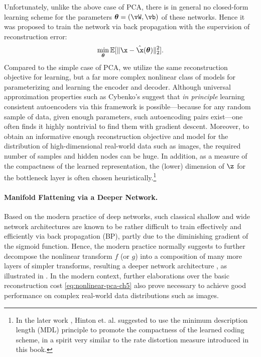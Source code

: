 \documentclass[../../book-main.tex]{subfiles}
\begin{document}
Unfortunately, unlike the above case of PCA, there is in general no
closed-form learning scheme for the parameters $\boldsymbol{\theta} =
(\vW, \vb)$ of these networks. Hence it was proposed to train the
network via back propagation with the supervision of reconstruction error:
\begin{equation}\label{eq:nonlinear-pca-ch5}
  \min_{\boldsymbol{\theta}} \mathbb{E}[ \|\x - \hat{\x}(\boldsymbol{\theta})\|_2^2].
\end{equation}
Compared to the simple case of PCA, we utilize the same reconstruction objective
for learning, but a far more complex nonlinear class of models for
parameterizing and learning the encoder and decoder. Although universal
approximation properties such as Cybenko's suggest that \textit{in principle}
learning consistent autoencoders via this framework is possible---because for
any random sample of data, given enough parameters, such autoencoding pairs
exist---one often finds it highly nontrivial to find them with gradient descent.
Moreover, to obtain an informative enough reconstruction objective
and model for the
distribution of high-dimensional real-world data such as images, the required
number of samples and hidden nodes can be huge.
In addition, as a measure of the compactness of the learned representation, the
(lower) dimension of $\z$ for the bottleneck layer is often chosen
heuristically.\footnote{In the later work \cite{Hinton-1993}, Hinton et.
  al. suggested to use the minimum description length (MDL) principle to promote
  the compactness of the learned coding scheme, in a spirit very similar to the
rate distortion measure introduced in this book.}

\paragraph{Manifold Flattening via a Deeper Network.}
Based on the modern practice of deep networks, such classical shallow
and wide network architectures are known to be rather difficult to
train effectively and efficiently via back propagation (BP), partly
due to the diminishing gradient of the sigmoid function. Hence, the
modern practice normally suggests to further
decompose the nonlinear transform $f$ (or $g$) into a composition of
many more layers of simpler transforms, resulting a deeper network architecture
\cite{Hinton504}, as illustrated in .
In the modern context, further elaborations over the basic reconstruction cost
\eqref{eq:nonlinear-pca-ch5} also prove necessary to achieve good performance on
complex real-world data distributions such as images.
\end{document}
